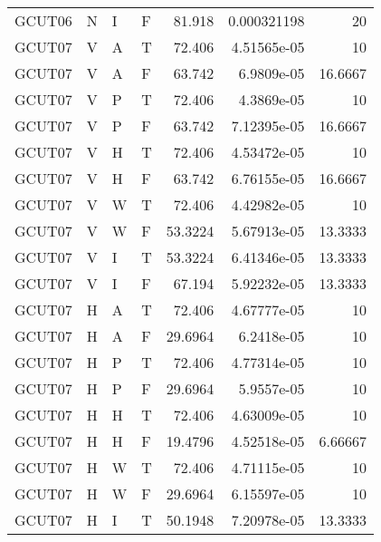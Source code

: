 \begin{longtable}{llllrrr}
    GCUT06   & N         & I         & F          & 81.918     & 0.000321198 & 20       \\
    GCUT07   & V         & A         & T          & 72.406     & 4.51565e-05 & 10       \\
    GCUT07   & V         & A         & F          & 63.742     & 6.9809e-05  & 16.6667  \\
    GCUT07   & V         & P         & T          & 72.406     & 4.3869e-05  & 10       \\
    GCUT07   & V         & P         & F          & 63.742     & 7.12395e-05 & 16.6667  \\
    GCUT07   & V         & H         & T          & 72.406     & 4.53472e-05 & 10       \\
    GCUT07   & V         & H         & F          & 63.742     & 6.76155e-05 & 16.6667  \\
    GCUT07   & V         & W         & T          & 72.406     & 4.42982e-05 & 10       \\
    GCUT07   & V         & W         & F          & 53.3224    & 5.67913e-05 & 13.3333  \\
    GCUT07   & V         & I         & T          & 53.3224    & 6.41346e-05 & 13.3333  \\
    GCUT07   & V         & I         & F          & 67.194     & 5.92232e-05 & 13.3333  \\
    GCUT07   & H         & A         & T          & 72.406     & 4.67777e-05 & 10       \\
    GCUT07   & H         & A         & F          & 29.6964    & 6.2418e-05  & 10       \\
    GCUT07   & H         & P         & T          & 72.406     & 4.77314e-05 & 10       \\
    GCUT07   & H         & P         & F          & 29.6964    & 5.9557e-05  & 10       \\
    GCUT07   & H         & H         & T          & 72.406     & 4.63009e-05 & 10       \\
    GCUT07   & H         & H         & F          & 19.4796    & 4.52518e-05 & 6.66667  \\
    GCUT07   & H         & W         & T          & 72.406     & 4.71115e-05 & 10       \\
    GCUT07   & H         & W         & F          & 29.6964    & 6.15597e-05 & 10       \\
    GCUT07   & H         & I         & T          & 50.1948    & 7.20978e-05 & 13.3333  \\

\end{longtable}
